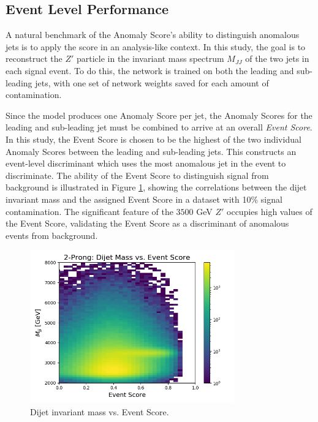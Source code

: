\documentclass[11pt, a4paper]{article}
\begin{document}
\subsection{Event Level Performance}


A natural benchmark of the Anomaly Score's ability to distinguish anomalous jets is to apply the score in an analysis-like context. In this study, the goal is to reconstruct the $Z'$ particle in the invariant mass spectrum $M_{JJ}$ of the two jets in each signal event. To do this, the network is trained on both the leading and sub-leading jets, with one set of network weights saved for each amount of contamination. 

Since the model produces one Anomaly Score per jet, the Anomaly Scores for the leading and sub-leading jet must be combined to arrive at an overall \textit{Event Score}. In this study, the Event Score is chosen to be the highest of the two individual Anomaly Scores between the leading and sub-leading jets. This constructs an event-level discriminant which uses the most anomalous jet in the event to discriminate. The ability of the Event Score to distinguish signal from background is illustrated in Figure \ref{fig:mjj_vs_evscore}, showing the correlations between the dijet invariant mass and the assigned Event Score in a dataset with 10\% signal contamination. The significant feature of the $3500$ GeV $Z'$ occupies high values of the Event Score, validating the Event Score as a discriminant of anomalous events from background.

\begin{figure}[H]
	\begin{center}
		\includegraphics[width=250pt]{imgs/ProcR_2Prong_Contaminated_10p0_2Prong_Contaminated_10p0_Weights_Event_ConstOnly_Avg_JJ_M_vs_Event_Score_SaveForPaper_Lead_Colorbar.png}
	\end{center}
	\caption{Dijet invariant mass vs. Event Score.}
	\label{fig:mjj_vs_evscore}
\end{figure}
\end{document}
